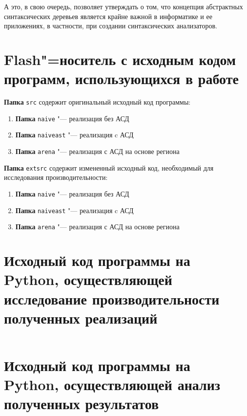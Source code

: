 \documentclass[coursework]{SCWorks}
\begin{document}
А это, в свою очередь, позволяет утверждать о том, что концепция абстрактных 
синтаксических деревьев является крайне важной в информатике и ее приложениях, 
в частности, при создании синтаксических анализаторов.

%






\appendix
\section{Flash"=носитель с исходным кодом программ, использующихся в работе}
{\raggedright
\textbf{Папка} \texttt{src} содержит оригинальный исходный код программы:
}

\begin{enumerate}
    \item[] \textbf{Папка} \texttt{naive} "--- реализация без АСД
    \item[] \textbf{Папка} \texttt{naiveast} "--- реализация c АСД
    \item[] \textbf{Папка} \texttt{arena} "--- реализация с АСД на основе 
    региона
\end{enumerate}

{\raggedright
\textbf{Папка} \texttt{extsrc} содержит измененный исходный код, необходимый для
исследования производительности:
}

\begin{enumerate}
    \item[] \textbf{Папка} \texttt{naive} "--- реализация без АСД
    \item[] \textbf{Папка} \texttt{naiveast} "--- реализация c АСД
    \item[] \textbf{Папка} \texttt{arena} "--- реализация с АСД на основе 
    региона
\end{enumerate}

\section{Исходный код программы на Python, осуществляющей исследование
производительности полученных реализаций}
\inputminted{python}{requirements/src/test.py}

\section{Исходный код программы на Python, осуществляющей анализ полученных 
результатов}
\inputminted{python}{requirements/src/graph.py}
\end{document}
